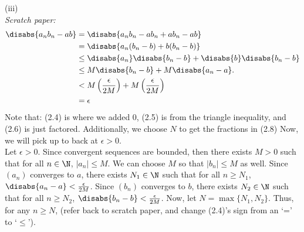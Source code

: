 {(iii) \\
\textit{Scratch paper:}
\begin{align}
    \disabs{a_nb_n - ab} & = \disabs{a_nb_n - ab_n + ab_n - ab}                                    \\
                         & = \disabs{a_n(b_n - b) + b(b_n - b)}                                    \\
                         & \leq \disabs{a_n}\disabs{b_n - b} + \disabs{b}\disabs{b_n - b}          \\
                         & \leq M\disabs{b_n - b} + M\disabs{a_n - a}.                             \\
                         & < M\left(\frac{\epsilon}{2M}\right) + M\left(\frac{\epsilon}{2M}\right) \\
                         & = \epsilon
\end{align}
Note that: (2.4) is where we added 0, (2.5) is from the triangle inequality, and (2.6) is just factored. Additionally, we choose \(N\) to get the fractions in (2.8) Now, we will pick up to back at \(\epsilon > 0\). \\

Let \(\epsilon > 0\). Since convergent sequences are bounded, then there exists \(M > 0\) such that for all \(n \in \N\), \(|a_n| \leq M\). We can choose \(M\) so that \(|b_n| \leq M\) as well. Since \((a_n)\) converges to \(a\), there exists \(N_1 \in \N\) such that for all \(n \geq N_1\), \(\disabs{a_n - a} < \frac{\epsilon}{2M}\). Since \((b_n)\) converges to \(b\), there exists \(N_2 \in \N\) such that for all \(n \geq N_2\), \(\disabs{b_n - b} < \frac{\epsilon}{2M}\). Now, let \(N = \max\{N_1, N_2\}\). Thus, for any \(n \geq N\), (refer back to scratch paper, and change (2.4)'s sign from an `=' to `\(\leq\)'). \\

}
